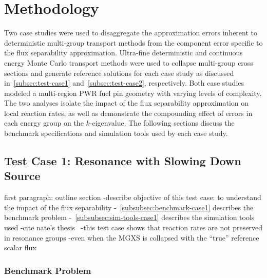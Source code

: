 \section{Methodology}
\label{sec:methodology}

Two case studies were used to disaggregate the approximation errors inherent to deterministic multi-group transport methods from the component error specific to the flux separability approximation. Ultra-fine deterministic and continuous energy Monte Carlo transport methods were used to collapse multi-group cross sections and generate reference solutions for each case study as discussed in~\autoref{subsec:test-case1} and~\autoref{subsec:test-case2}, respectively. Both case studies modeled a multi-region PWR fuel pin geometry with varying levels of complexity. The two analyses isolate the impact of the flux separability approximation on local reaction rates, as well as demonstrate the compounding effect of errors in each energy group on the $k$-eigenvalue. The following sections discuss the benchmark specifications and simulation tools used by each case study.



\subsection{Test Case 1: Resonance with Slowing Down Source}
\label{subsec:test-case1}

first paragraph: outline section
-describe objective of this test case: to understand the impact of the flux separability 
-~\autoref{subsubsec:benchmark-case1} describes the benchmark problem
-~\autoref{subsubsec:sim-tools-case1} describes the simulation tools used
-cite nate's thesis~\cite{gibson2016thesis}
-this test case shows that reaction rates are not preserved in resonance groups
  -even when the MGXS is collapsed with the ``true'' reference scalar flux

\subsubsection{Benchmark Problem}
\label{subsubsec:benchmark-case1}

